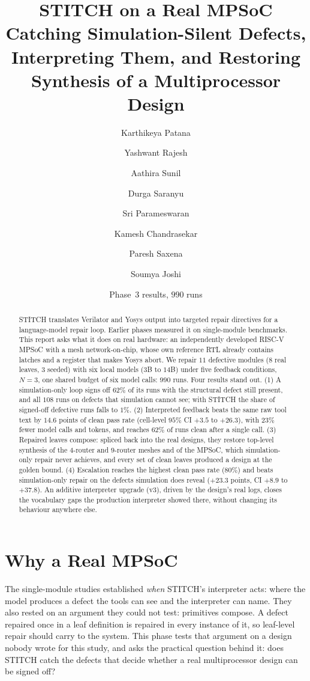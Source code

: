 \documentclass[11pt]{article}
\title{\textbf{STITCH on a Real MPSoC}\\[4pt]
\large\textnormal{Catching Simulation-Silent Defects, Interpreting Them, and
Restoring Synthesis of a Multiprocessor Design}}
\author{Karthikeya Patana \and Yashwant Rajesh \and Aathira Sunil \and Durga Saranyu \and Sri Parameswaran \and Kamesh Chandrasekar \and Paresh Saxena \and Soumya Joshi}
\date{Phase~3 results, $990$ runs}
\begin{document}
\maketitle

\begin{abstract}
STITCH translates Verilator and Yosys output into targeted repair directives
for a language-model repair loop. Earlier phases measured it on single-module
benchmarks. This report asks what it does on real hardware: an independently
developed RISC-V MPSoC with a mesh network-on-chip, whose own reference RTL
already contains latches and a register that makes Yosys abort. We repair
$11$ defective modules ($8$ real leaves, $3$ seeded) with six local models
($3$B to $14$B) under five feedback conditions, $N{=}3$, one shared budget of
six model calls: $990$ runs. Four results stand out. (1) A simulation-only
loop signs off $62\%$ of its runs with the structural defect still present,
and all $108$ runs on defects that simulation cannot see; with STITCH the
share of signed-off defective runs falls to $1\%$. (2) Interpreted feedback
beats the same raw tool text by $14.6$ points of clean pass rate (cell-level
$95\%$ CI $+3.5$ to $+26.3$), with $23\%$ fewer model calls and tokens, and
reaches $62\%$ of runs clean after a single call. (3) Repaired leaves compose:
spliced back into the real designs, they restore top-level synthesis of the
$4$-router and $9$-router meshes and of the MPSoC, which simulation-only repair
never achieves, and every set of clean leaves produced a design at the golden
bound. (4) Escalation reaches the highest clean pass rate ($80\%$) and beats
simulation-only repair on the defects simulation does reveal ($+23.3$ points,
CI $+8.9$ to $+37.8$). An additive interpreter upgrade (v3), driven by the
design's real logs, closes the vocabulary gaps the production interpreter
showed there, without changing its behaviour anywhere else.
\end{abstract}

\section{Why a Real MPSoC}
\label{sec:why}

The single-module studies established \emph{when} STITCH's interpreter acts:
where the model produces a defect the tools can see and the interpreter can
name. They also rested on an argument they could not test: primitives compose.
A defect repaired once in a leaf definition is repaired in every instance of
it, so leaf-level repair should carry to the system. This phase tests that
argument on a design nobody wrote for this study, and asks the practical
question behind it: does STITCH catch the defects that decide whether a real
multiprocessor design can be signed off?
\end{document}
